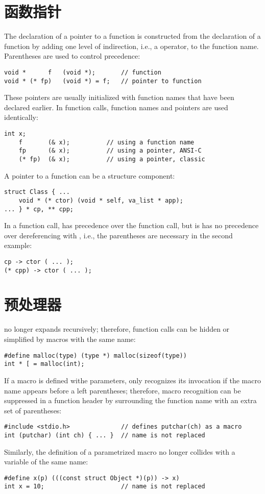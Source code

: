 \section{函数指针}
The declaration of a pointer to a function is constructed from the
declaration of a function by adding one level of indirection, i.e., a
\ccbf{*} operator, to the function name. Parentheses are used to control
precedence:
\begin{lstlisting}
void * 		f	(void *);		// function
void * (* fp)	(void *) = f;	// pointer to function
\end{lstlisting}
These pointers are usually initialized with function names that have been
declared earlier. In function calls, function names and pointers are used
identically:
\begin{lstlisting}
int x;
	f		(& x);			// using a function name
	fp		(& x);			// using a pointer, ANSI-C
	(* fp)	(& x);			// using a pointer, classic
\end{lstlisting}
A pointer to a function can be a structure component:
\begin{lstlisting}
struct Class { ...
	void * (* ctor) (void * self, va_list * app);
... } * cp, ** cpp;
\end{lstlisting}
In a function call, \ccbf{->} has precedence over the function call, but is
has no precedence over dereferencing with \ccbf{*}, i.e., the parentheses
are necessary in the second example:
\begin{lstlisting}
cp -> ctor ( ... );
(* cpp) -> ctor ( ... );
\end{lstlisting}

\section{预处理器}
 no longer expands  recursively; therefore,
function calls can be hidden or simplified by macros with the same name:
\begin{lstlisting}
#define malloc(type) (type *) malloc(sizeof(type))
int * [ = malloc(int);
\end{lstlisting}
If a macro is defined withe parameters,  only recognizes its
invocation if the macro name appears before a left parentheses; therefore,
macro recognition can be suppressed in a function header by surrounding the
function name with an extra set of parentheses:
\begin{lstlisting}
#include <stdio.h>				// defines putchar(ch) as a macro
int (putchar) (int ch) { ... }	// name is not replaced
\end{lstlisting}
Similarly, the definition of a parametrized macro no longer collides with a
variable of the same name:
\begin{lstlisting}
#define x(p) (((const struct Object *)(p)) -> x)
int x = 10;						// name is not replaced
\end{lstlisting}

